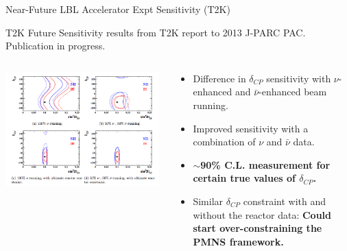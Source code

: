 \begin{frame}{Near-Future LBL Accelerator Expt Sensitivity (T2K)}

{\tiny T2K Future Sensitivity results from T2K report to 2013 J-PARC PAC. Publication in progress.}
\begin{columns}[T]
  \begin{column}{0.63\textwidth}
  {
    \begin{center}
     \includegraphics[width=0.98\textwidth]{./images/3nu/accelerator/future_sensitivity/t2k/deltacp_sensitivity_2x2cases_minuspi2.png}\\
    \end{center}
  }
  \end{column}
  \begin{column}{0.36\textwidth}
    \vspace{0.3cm}
    {\scriptsize
     \begin{itemize}
       \item Difference in $\delta_{CP}$ sensitivity with $\nu$-enhanced and $\bar{\nu}$-enhanced beam running.
       \vspace{0.1cm}
       \item Improved sensitivity with a combination of $\nu$ and $\bar{\nu}$ data.
       \vspace{0.1cm}
       \item {\bf $\sim$90\% C.L. measurement for certain true values of $\delta_{CP}$.}
       \vspace{0.1cm}
       \item Similar $\delta_{CP}$ constraint with and without the reactor data:
             {\bf Could start over-constraining the PMNS framework.}

\end{itemize}}
\end{column}
\end{columns}
\end{frame}

